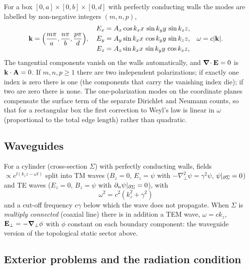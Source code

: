 \begin{example}
For a box $[0,a]\times[0,b]\times[0,d]$ with perfectly conducting
walls the modes are labelled by non-negative integers $(m,n,p)$,
\begin{equation}
\mathbf{k}=\Big(\frac{m\pi}a,\frac{n\pi}b,\frac{p\pi}d\Big),\quad
\begin{aligned}
E_x&=A_x\cos k_xx\,\sin k_yy\,\sin k_zz,\\
E_y&=A_y\sin k_xx\,\cos k_yy\,\sin k_zz,\\
E_z&=A_z\sin k_xx\,\sin k_yy\,\cos k_zz,
\end{aligned}
\quad \omega=c|\mathbf{k}| .
\end{equation}
The tangential components vanish on the walls automatically, and
$\boldsymbol{\nabla}\!\cdot\mathbf{E}=0$ is $\mathbf{k}\cdot\mathbf A=0$.  If $m,n,p\ge1$ there are two
independent polarizations; if exactly one index is zero there is one
(the components that carry the vanishing index die); if two are zero
there is none.  The one-polarization modes on the coordinate planes compensate the
surface term of the separate Dirichlet and Neumann counts, so that for a
rectangular box the first correction to Weyl's law is linear in $\omega$
(proportional to the total edge length) rather than quadratic.
\end{example}

\subsection{Waveguides}

For a cylinder (cross-section $\Sigma$) with perfectly conducting walls,
fields $\propto e^{\ii(k_zz-\omega t)}$ split into TM waves
($B_z=0$, $E_z=\psi$ with $-\nabla_\perp^2\psi=\gamma^2\psi$, $\psi|_{\partial\Sigma}=0$) and TE waves
($E_z=0$, $B_z=\psi$ with $\partial_n\psi|_{\partial\Sigma}=0$), with
\begin{equation}
\omega^2=c^2(k_z^2+\gamma^2)
\end{equation}
and a cut-off frequency $c\gamma$ below which the wave does not propagate.  When
$\Sigma$ is \emph{multiply connected} (coaxial line) there is in
addition a TEM wave, $\omega=ck_z$, $\mathbf{E}_\perp=-\boldsymbol{\nabla}_\perp\phi$ with
$\phi$ constant on each boundary component: the waveguide version of the
topological static sector above.

\subsection{Exterior problems and the radiation condition}

